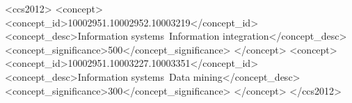 \documentclass[acmsmall,natbib=false]{acmart}
\begin{document}


\begin{CCSXML}
<ccs2012>
   <concept>
       <concept_id>10002951.10002952.10003219</concept_id>
       <concept_desc>Information systems~Information integration</concept_desc>
       <concept_significance>500</concept_significance>
       </concept>
   <concept>
       <concept_id>10002951.10003227.10003351</concept_id>
       <concept_desc>Information systems~Data mining</concept_desc>
       <concept_significance>300</concept_significance>
       </concept>
 </ccs2012>
\end{CCSXML}



\end{document}
